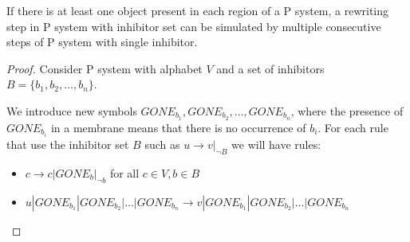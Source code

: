 \begin{lemma}
\label{lemma:inhibitor_step}
  If there is at least one object present in each region of a P system, a rewriting step in P system with inhibitor set can be simulated by multiple consecutive steps of P system with single inhibitor.
\end{lemma}

\begin{proof}\sloppy
  Consider P system with alphabet $V$ and a set of inhibitors ${B=\{b_1, b_2, \dots ,b_n\}}$.
  
  We introduce new symbols $GONE_{b_1}, GONE_{b_2}, \dots , GONE_{b_n}$, where the presence of $GONE_{b_i}$ in a membrane means that there is no occurrence of $b_i$.
  For each rule that use the inhibitor set $B$ such as $u\rightarrow v|_{\neg B}$ we will have rules:
  \begin{itemize}
    \item $c \rightarrow c|GONE_{b}|_{\neg b}$ for all $ c\in V, b\in B$
    \item $u|GONE_{b_1}|GONE_{b_2}|\dots|GONE_{b_n} \rightarrow v|GONE_{b_1}|GONE_{b_2}|\dots|GONE_{b_n}$
  \end{itemize}
\end{proof}
